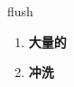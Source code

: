 
\begin{frame}
{\huge flush}
\begin{center}
\begin{enumerate}\Large
  \item \textbf{大量的}
  \item \textbf{冲洗}
\end{enumerate}
\end{center}
\end{frame}
